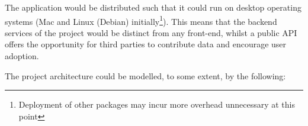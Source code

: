 
The application would be distributed such that it could run on desktop operating systems (Mac and Linux (Debian) initially\footnote{Deployment of other packages may incur more overhead unnecessary at this point}). This means that the backend services of the project would be distinct from any front-end, whilst a public API offers the opportunity for third parties to contribute data and encourage user adoption.

The project architecture could be modelled, to some extent, by the following:


